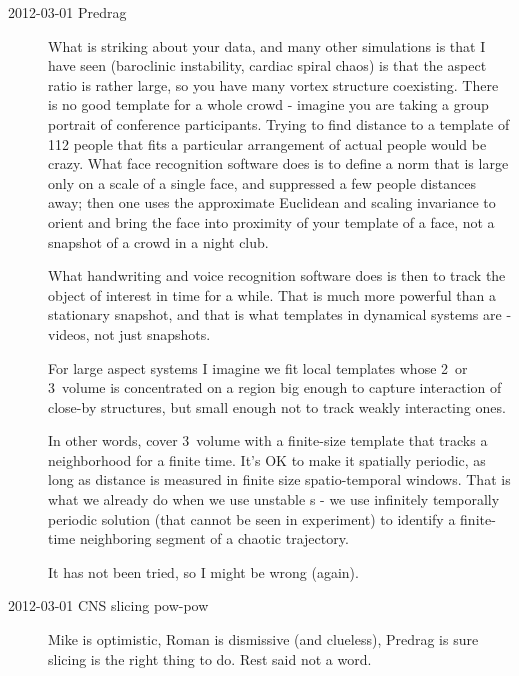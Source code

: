 \begin{description}
\item[2012-03-01 Predrag] What is striking about your data, and many
other simulations is that I have seen (baroclinic instability, cardiac
spiral chaos) is that the aspect ratio is rather large, so you have many
vortex structure coexisting. There is no good template for a whole crowd
- imagine you are taking a group portrait of conference participants.
Trying to find distance to a template of 112 people that fits a
particular arrangement of actual people would be crazy. What face
recognition software does is to define a norm that is large only on a
scale of a single face, and suppressed a few people distances away; then
one uses the approximate Euclidean and scaling invariance to orient and
bring the face into proximity of your template of a face, not a snapshot
of a crowd in a night club.

What handwriting and voice recognition software does is then to track the
object of interest in time for a while. That is much more powerful than a
stationary snapshot, and that is what templates in dynamical systems are
- videos, not just snapshots.

For large aspect systems I imagine we fit local templates whose 2\dmn\
or 3\dmn\ volume is concentrated on a region big enough to capture
interaction of close-by structures, but small enough not to track weakly
interacting ones.

In other words, cover 3\dmn\ volume with a finite-size template that
tracks a neighborhood for a finite time. It's OK to make it spatially
periodic, as long as distance is measured in finite size spatio-temporal
windows. That is what we already do when we use unstable \po s - we use
infinitely temporally periodic solution (that cannot be seen in
experiment) to identify a finite-time neighboring segment of a chaotic
trajectory.

It has not been tried, so I might be wrong (again).

\item[2012-03-01 CNS slicing pow-pow] Mike is optimistic, Roman is
dismissive (and clueless), Predrag is sure slicing is the right thing to
do. Rest said not a word.

\end{description}
